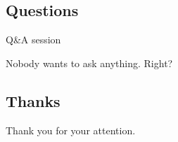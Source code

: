 \documentclass{beamer}
\begin{document}
\subsection{Questions}
\begin{frame}{Q\&A session}
	\begin{center}Nobody wants to ask anything. Right?\end{center}
\end{frame}

\subsection{Thanks}
\begin{frame}{}
	\begin{center}Thank you for your attention.\end{center}
\end{frame}
\end{document}
